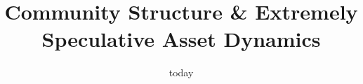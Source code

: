 \documentclass{article}%
\begin{document}
\title{Community Structure \& Extremely Speculative Asset Dynamics}
%


\date{today}


\maketitle
\begin{abstract}


\end{abstract}
\end{document}
